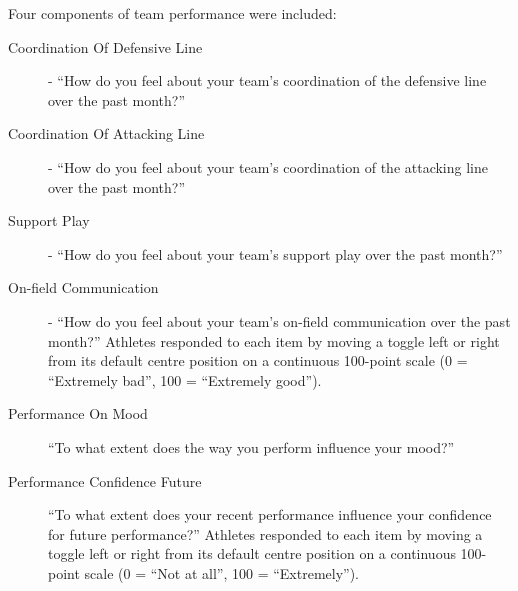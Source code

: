 Four components of team performance were included:
\begin{description}
\item[Coordination Of Defensive Line] - ``How do you feel about your team's coordination of the defensive line over the past month?''
\item[Coordination Of Attacking Line] - ``How do you feel about your team's coordination of the attacking line over the past month?''
\item[Support Play] - ``How do you feel about your team's support play over the past month?''
\item[On-field Communication] - ``How do you feel about your team's on-field communication over the past month?''
Athletes responded to each item by moving a toggle left or right from its default centre position on a continuous 100-point scale (0 = ``Extremely bad'', 100 = ``Extremely good'').
\end{description}

\begin{description}
\item[Performance On Mood] ``To what extent does the way you perform influence your mood?''
\item [Performance Confidence Future] ``To what extent does your recent performance influence your confidence for future performance?''
Athletes responded to each item by moving a toggle left or right from its default centre position on a continuous 100-point scale (0 = ``Not at all'', 100 = ``Extremely'').
\end{description}



